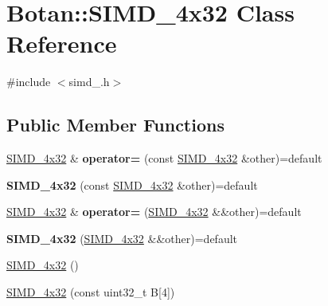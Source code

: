 \hypertarget{class_botan_1_1_s_i_m_d__4x32}{}\section{Botan\+:\+:S\+I\+M\+D\+\_\+4x32 Class Reference}
\label{class_botan_1_1_s_i_m_d__4x32}


{\ttfamily \#include $<$simd\+\_.\+h$>$}

\subsection*{Public Member Functions}
\begin{DoxyCompactItemize}
\item 
\mbox{\label{class_botan_1_1_s_i_m_d__4x32_a135b317fa2e60ab44a348e82c8bfbcce}} 
\mbox{\hyperlink{class_botan_1_1_s_i_m_d__4x32}{S\+I\+M\+D\+\_\+4x32}} \& {\bfseries operator=} (const \mbox{\hyperlink{class_botan_1_1_s_i_m_d__4x32}{S\+I\+M\+D\+\_\+4x32}} \&other)=default
\item 
\mbox{\label{class_botan_1_1_s_i_m_d__4x32_a6b21cda755fd9d0d8b9691444c790be8}} 
{\bfseries S\+I\+M\+D\+\_\+4x32} (const \mbox{\hyperlink{class_botan_1_1_s_i_m_d__4x32}{S\+I\+M\+D\+\_\+4x32}} \&other)=default
\item 
\mbox{\label{class_botan_1_1_s_i_m_d__4x32_a86ae367a9c339260be6e36f1c1201e4c}} 
\mbox{\hyperlink{class_botan_1_1_s_i_m_d__4x32}{S\+I\+M\+D\+\_\+4x32}} \& {\bfseries operator=} (\mbox{\hyperlink{class_botan_1_1_s_i_m_d__4x32}{S\+I\+M\+D\+\_\+4x32}} \&\&other)=default
\item 
\mbox{\label{class_botan_1_1_s_i_m_d__4x32_a0eb5f1e16c18f062b2f6653f4829cf14}} 
{\bfseries S\+I\+M\+D\+\_\+4x32} (\mbox{\hyperlink{class_botan_1_1_s_i_m_d__4x32}{S\+I\+M\+D\+\_\+4x32}} \&\&other)=default
\item 
\mbox{\hyperlink{class_botan_1_1_s_i_m_d__4x32_a9f098b406c1627b5f7c96c92e694c3bb}{S\+I\+M\+D\+\_\+4x32}} ()
\item 
\mbox{\hyperlink{class_botan_1_1_s_i_m_d__4x32_a972106456988848b1b0736ba70ee2620}{S\+I\+M\+D\+\_\+4x32}} (const uint32\+\_\+t B\mbox{[}4\mbox{]})
\item 

\end{DoxyCompactItemize}
